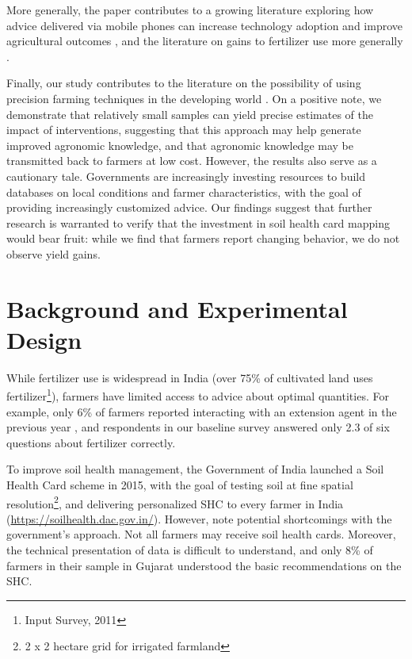 \documentclass{article}
\begin{document}
More generally, the paper contributes to a growing literature exploring how advice delivered via mobile phones can increase technology adoption and improve agricultural outcomes \citep{Casaburi2019HarnessingKenya,Fabregas2019SMS-extensionAfrica,Cole2020MobileizingSustainability}, and the literature on gains to fertilizer use more generally \citep{Beaman2013ProfitabilityMali}. 

Finally, our study contributes to the literature on the possibility of using precision farming techniques in the developing world \citep{Mondal2009AdoptionStrategies,Maohua2001PossibleMillennium}. On a positive note, we demonstrate that relatively small samples can yield precise estimates of the impact of interventions, suggesting that this approach may help generate improved agronomic knowledge, and that agronomic knowledge may be transmitted back to farmers at low cost. However, the results also serve as a cautionary tale. Governments are increasingly investing resources to build databases on local conditions and farmer characteristics, with the goal of providing increasingly customized advice. Our findings suggest that further research is warranted to verify that the investment in soil health card mapping would bear fruit: while we find that farmers report changing behavior, we do not observe yield gains.  

\section{Background and Experimental Design}

While fertilizer use is widespread in India (over 75\% of cultivated land uses fertilizer\footnote{Input Survey, 2011}), farmers have limited access to advice about optimal quantities. For example, only 6\% of farmers reported interacting with an extension agent in the previous year \citep{Cole2017TheAgriculture}, and respondents in our baseline survey answered only 2.3 of six questions about fertilizer correctly.

To improve soil health management, the Government of India launched a Soil Health Card scheme in 2015, with the goal of testing soil at fine spatial resolution\footnote{2 x 2 hectare grid for irrigated farmland}, and delivering personalized SHC to every farmer in India (\url{https://soilhealth.dac.gov.in/}). However, \citet{Cole2017TheAgriculture} note potential shortcomings with the government's approach. Not all farmers may receive soil health cards. Moreover, the technical presentation of data is difficult to understand, and only 8\% of farmers in their sample in Gujarat understood the basic recommendations on the SHC. 
\end{document}

